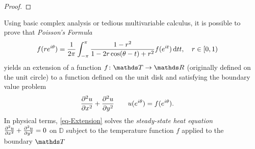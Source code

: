 \documentclass{../homework}
\begin{document}
\begin{Exercise}
\begin{enumerate}
    \begin{solution}
      \begin{proof}

      \end{proof}
    \end{solution}
  \end{enumerate}

  Using basic complex analysis or tedious multivariable calculus, it
  is possible to prove that \emph{Poisson's Formula}
  \begin{equation}\label{eq-Extension}
    f(re^{i\theta}) = \frac{1}{2\pi} \int_{-\pi}^{\pi}
    \frac{1 - r^2}{1 - 2r \cos(\theta - t) + r^2} f(e^{it}) \dif tt,
    \quad r \in [0,1)
  \end{equation}
  yields an extension of a function \(f\colon \T\to\R\) (originally
  defined on the unit circle) to a function defined on the unit disk
  and satisfying the boundary value problem
  \begin{equation*}
    \pd[2] u x + \pd[2] u y
    \qquad u(e^{i\theta}) = f(e^{i\theta}).
  \end{equation*}
  In physical terms, \eqref{eq-Extension} solves the
  \emph{steady-state heat equation} \(\pd[2] u x + \pd[2] u y = 0\) on
  \(\mathbb{D}\) subject to the temperature function \(f\) applied to
  the boundary \(\T\)
\end{Exercise}
\end{document}
